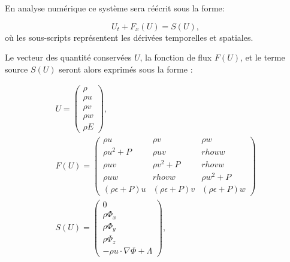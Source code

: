 %



En analyse numérique ce système sera réécrit sous la forme:

\begin{equation}
U_t+F_x(U) = S(U),
\label{eq:conservation}
\end{equation}
où les sous-scripts représentent les dérivées temporelles et spatiales.

Le vecteur des quantité conservées $U$, la fonction de flux $F(U)$, et le terme source $S(U)$ seront alors exprimés sous la forme :

\begin{equation}
\begin{array}{c}

U=
\left(
\begin{array}{c}
{ \rho}\\
{\rho u}\\
{\rho v}\\
{\rho w}\\
{\rho E}
\end{array}
\right),
\\
F(U)=
\left(
\begin{array}{ccc}
\rho u & \rho v & \rho w \\ 
\rho u^2 +P & \rho uv & rho uw \\ 
\rho uv & \rho v^2 +P & rho vw \\ 
\rho uw & rho vw &\rho w^2 +P \\ 
(\rho \epsilon + P)u & (\rho \epsilon + P)v & (\rho \epsilon + P)w
\end{array} 
\right)
\\
S(U) =
\left(
\begin{array}{c}
{ 0}\\
{\rho \Phi_x}\\
{\rho \Phi_y}\\
{\rho \Phi_z}\\
{- \rho u \cdot \nabla \Phi + \Lambda }
\end{array}
\right),
\end{array} 
\end{equation}


